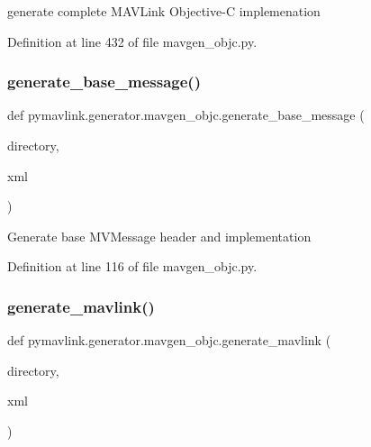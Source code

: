 \begin{DoxyVerb}generate complete MAVLink Objective-C implemenation\end{DoxyVerb}
 

Definition at line 432 of file mavgen\+\_\+objc.\+py.

\mbox{\label{namespacepymavlink_1_1generator_1_1mavgen__objc_a62689e6ef17a3f47ebe23fdb19258f4b}} 
\subsubsection{\texorpdfstring{generate\_base\_message()}{generate\_base\_message()}}
{\footnotesize\ttfamily def pymavlink.\+generator.\+mavgen\+\_\+objc.\+generate\+\_\+base\+\_\+message (\begin{DoxyParamCaption}\item[{}]{directory,  }\item[{}]{xml }\end{DoxyParamCaption})}

\begin{DoxyVerb}Generate base MVMessage header and implementation\end{DoxyVerb}
 

Definition at line 116 of file mavgen\+\_\+objc.\+py.

\mbox{\label{namespacepymavlink_1_1generator_1_1mavgen__objc_a029723100a1cc0db78017c05edbc66a9}} 
\subsubsection{\texorpdfstring{generate\_mavlink()}{generate\_mavlink()}}
{\footnotesize\ttfamily def pymavlink.\+generator.\+mavgen\+\_\+objc.\+generate\+\_\+mavlink (\begin{DoxyParamCaption}\item[{}]{directory,  }\item[{}]{xml }\end{DoxyParamCaption})}

